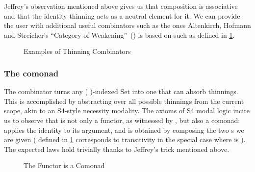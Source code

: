 Jeffrey's observation mentioned above gives us that composition is
associative and that the identity thinning acts as a neutral
element for it. We can provide the user with additional useful
combinators such as the ones Altenkirch, Hofmann and Streicher's
``Category of Weakening''~(\citeyear{altenkirch1995categorical})
is based on such as  defined in \cref{fig:extendth}.

\begin{figure}[h]
\begin{minipage}{0.5\textwidth}
\end{minipage}\begin{minipage}{0.5\textwidth}
\end{minipage}

\caption{Examples of Thinning Combinators\label{fig:extendth}}
\end{figure}

\subsubsection{The  comonad}

The  combinator turns any ( )-indexed Set into
one that can absorb thinnings. This is accomplished by abstracting
over all possible thinnings from the current scope, akin to an
S4-style necessity modality. The axioms of S4 modal logic incite us
to observe that  is not only a functor, as witnessed by
, but also a comonad:  applies
the identity  to its argument, and  is obtained
by composing the two s we are given ( defined in
\cref{fig:extendth} corresponds to transitivity in the special case
where  is ). The expected laws hold trivially thanks
to Jeffrey's trick mentioned above.

\begin{figure}[h]
\begin{minipage}{0.5\textwidth}
\end{minipage}\begin{minipage}{0.5\textwidth}
\end{minipage}

\begin{minipage}{0.5\textwidth}
\end{minipage}\begin{minipage}{0.5\textwidth}
\end{minipage}
\caption{The  Functor is a Comonad}\label{fig:boxcomonad}
\end{figure}

